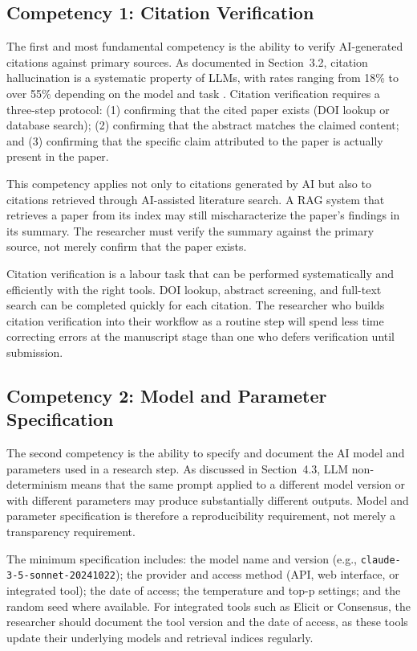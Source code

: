 \documentclass[12pt, a4paper]{article}
\begin{document}
\subsection{Competency 1: Citation Verification}

The first and most fundamental competency is the ability to verify AI-generated citations against primary sources. As documented in Section~3.2, citation hallucination is a systematic property of LLMs, with rates ranging from 18\% to over 55\% depending on the model and task \citep{walters2023fabrication, nature2026hallucination}. Citation verification requires a three-step protocol: (1) confirming that the cited paper exists (DOI lookup or database search); (2) confirming that the abstract matches the claimed content; and (3) confirming that the specific claim attributed to the paper is actually present in the paper.

This competency applies not only to citations generated by AI but also to citations retrieved through AI-assisted literature search. A RAG system that retrieves a paper from its index may still mischaracterize the paper's findings in its summary. The researcher must verify the summary against the primary source, not merely confirm that the paper exists.

Citation verification is a labour task that can be performed systematically and efficiently with the right tools. DOI lookup, abstract screening, and full-text search can be completed quickly for each citation. The researcher who builds citation verification into their workflow as a routine step will spend less time correcting errors at the manuscript stage than one who defers verification until submission.

\subsection{Competency 2: Model and Parameter Specification}

The second competency is the ability to specify and document the AI model and parameters used in a research step. As discussed in Section~4.3, LLM non-determinism means that the same prompt applied to a different model version or with different parameters may produce substantially different outputs. Model and parameter specification is therefore a reproducibility requirement, not merely a transparency requirement.

The minimum specification includes: the model name and version (e.g., \texttt{claude-3-5-sonnet-20241022}); the provider and access method (API, web interface, or integrated tool); the date of access; the temperature and top-p settings; and the random seed where available. For integrated tools such as Elicit or Consensus, the researcher should document the tool version and the date of access, as these tools update their underlying models and retrieval indices regularly.
\end{document}
